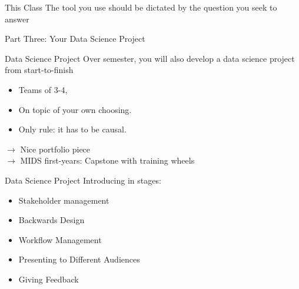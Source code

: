 \documentclass[11pt]{beamer}
\begin{document}
  
  \begin{frame}[c]{This Class}
  The tool you use should be dictated by the question you seek to answer
  \end{frame}
  
  \begin{frame}[c]
    \centering
    Part Three: Your Data Science Project
  \end{frame}
  
  \begin{frame}[c]{Data Science Project}
  Over semester, you will also develop a data science project from start-to-finish
  \begin{itemize}
    \item Teams of 3-4,
    \item On topic of your own choosing.
    \item Only rule: it has to be causal.
  \end{itemize}
  \pause $\rightarrow$ Nice portfolio piece\\
  \pause $\rightarrow$ MIDS first-years: Capstone with training wheels
  \end{frame}
  
  
  \begin{frame}[c]{Data Science Project}
    Introducing in stages:
    \begin{itemize}
      \pause \item Stakeholder management 
      \pause \item Backwards Design
      \pause \item Workflow Management 
      \pause \item Presenting to Different Audiences 
      \pause \item Giving Feedback
    \end{itemize}
  \end{frame}
    
\end{document}

